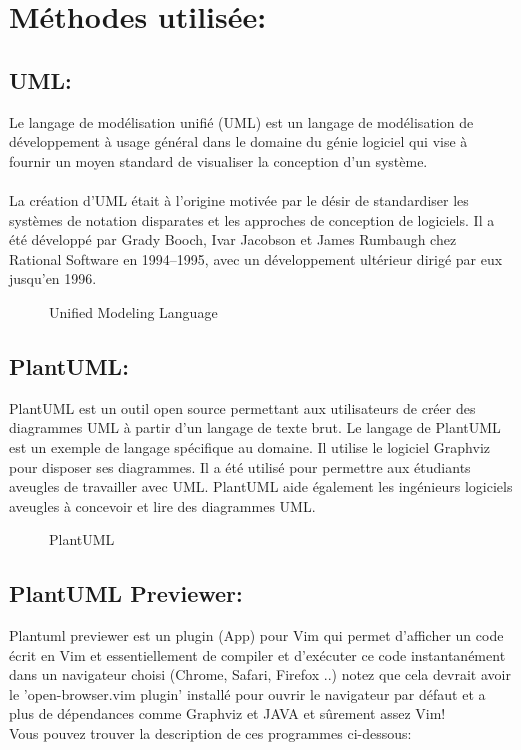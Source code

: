 \documentclass[12pt]{report}
\begin{document}
\newpage

\section{Méthodes utilisée:}

\subsection{UML:}
Le langage de modélisation unifié (UML) est un langage de modélisation de développement à usage général dans le domaine du génie logiciel qui vise à fournir un moyen standard de visualiser la conception d'un système.
\\\\
La création d'UML était à l'origine motivée par le désir de standardiser les systèmes de notation disparates et les approches de conception de logiciels. Il a été développé par Grady Booch, Ivar Jacobson et James Rumbaugh chez Rational Software en 1994–1995, avec un développement ultérieur dirigé par eux jusqu'en 1996.

\begin{figure}[h]
\centering
\caption{Unified Modeling Language}
\end{figure}

\vspace{-0.2in}
\subsection{PlantUML:}
PlantUML est un outil open source permettant aux utilisateurs de cr\'eer des diagrammes UML \`a partir d'un langage de texte brut. Le langage de PlantUML est un exemple de langage sp\'ecifique au domaine. Il utilise le logiciel Graphviz pour disposer ses diagrammes. Il a \'et\'e utilis\'e pour permettre aux \'etudiants aveugles de travailler avec UML\@. PlantUML aide \'egalement les ing\'enieurs logiciels aveugles \`a concevoir et lire des diagrammes UML\@.

\begin{figure}[h]
\centering
\vspace{-0.1in}
\caption{PlantUML}
\end{figure}

\newpage

\subsection{PlantUML Previewer:}
Plantuml previewer est un plugin (App) pour Vim qui permet d'afficher un code écrit en Vim et essentiellement de compiler et d'exécuter ce code instantanément dans un navigateur choisi (Chrome, Safari, Firefox ..) notez que cela devrait avoir le 'open-browser.vim  plugin' installé pour ouvrir le navigateur par défaut et a plus de dépendances comme Graphviz et JAVA et sûrement assez Vim!
\\
Vous pouvez trouver la description de ces programmes ci-dessous:
\end{document}
